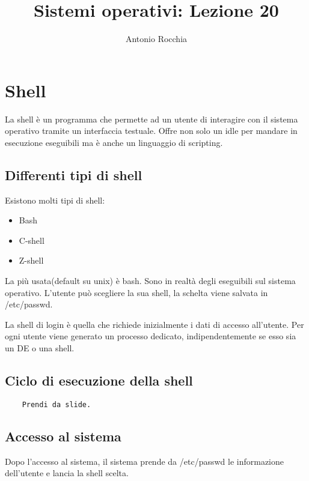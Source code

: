 \documentclass
[10pt,        %
 a4paper,     %
 onecolumn,   %
 fleqn,       %
 oneside,     %
 notitlepage, %
 openany      %
]{article}    %
\title{Sistemi operativi: Lezione 20}
\author{Antonio Rocchia}
\begin{document}
\maketitle          
\tableofcontents %

\section{Shell}
La shell è un programma che permette ad un utente di interagire con il sistema operativo tramite un interfaccia testuale.
Offre non solo un idle per mandare in esecuzione eseguibili ma è anche un linguaggio di scripting.

\subsection{Differenti tipi di shell}
Esistono molti tipi di shell:
\begin{itemize}
    \item Bash
    \item C-shell
    \item Z-shell
\end{itemize}
La più usata(default su unix) è bash. Sono in realtà degli eseguibili sul sistema operativo. L'utente può scegliere la sua shell, la schelta viene salvata in /etc/passwd.

La shell di login è quella che richiede inizialmente i dati di accesso all'utente. Per ogni utente viene generato un processo dedicato, indipendentemente se esso sia un DE o una shell.

\subsection{Ciclo di esecuzione della shell}

\begin{lstlisting}
    Prendi da slide.
\end{lstlisting}

\subsection{Accesso al sistema}
Dopo l'accesso al sistema, il sistema prende da /etc/passwd le informazione dell'utente e lancia la shell scelta.
\end{document}
